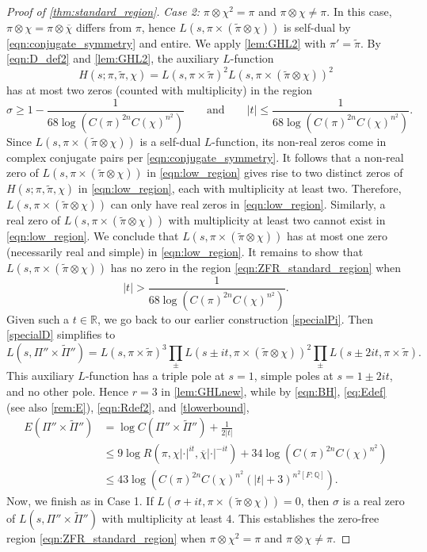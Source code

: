 \documentclass[12pt]{amsart}
\theoremstyle{definition}
\theoremstyle{remark}
\numberwithin{equation}{section}
\theoremstyle{plain}
\renewcommand{\tilde}{\widetilde}
\renewcommand{\bar}{\overline}
\newcommand{\Q}{\mathbb{Q}}
\newcommand{\R}{\mathbb{R}}
\begin{document}
\begin{proof}[Proof of \cref{thm:standard_region}]
\emph{Case 2:} $\pi\otimes\chi^2=\pi$ and $\pi\otimes\chi\neq\pi$. In this case, $\pi\otimes\chi=\pi\otimes\bar{\chi}$ differs from $\pi$, hence
$L(s,\pi\times(\tilde{\pi}\otimes\chi))$ is self-dual by \eqref{eqn:conjugate_symmetry} and entire.  We apply \cref{lem:GHL2} with $\pi'=\tilde\pi$. By \eqref{eqn:D_def2} and \cref{lem:GHL2}, the auxiliary $L$-function
\[H(s;\pi,\tilde\pi,\chi)=L(s,\pi\times\tilde\pi)^2L(s,\pi\times(\tilde{\pi}\otimes\chi))^2\]
has at most two zeros (counted with multiplicity) in the region
\begin{equation}
\label{eqn:low_region}
\sigma\geq 1-\frac{1}{68\log(C(\pi)^{2n}C(\chi)^{n^2})}
\qquad\text{and}\qquad
|t|\leq\frac{1}{68\log(C(\pi)^{2n}C(\chi)^{n^2})}.
\end{equation}
Since $L(s,\pi\times(\tilde{\pi}\otimes\chi))$ is a self-dual $L$-function, its non-real zeros come in complex conjugate pairs per \eqref{eqn:conjugate_symmetry}.  It follows that a non-real zero of $L(s,\pi\times(\tilde{\pi}\otimes\chi))$ in \eqref{eqn:low_region} gives rise to two distinct zeros of $H(s;\pi,\tilde\pi,\chi)$ in \eqref{eqn:low_region}, each with multiplicity at least two. Therefore, $L(s,\pi\times(\tilde{\pi}\otimes\chi))$ can only have real zeros in \eqref{eqn:low_region}. Similarly, a real zero of $L(s,\pi\times(\tilde{\pi}\otimes\chi))$ with multiplicity at least two cannot exist in \eqref{eqn:low_region}.  We conclude that $L(s,\pi\times(\tilde{\pi}\otimes\chi))$ 
has at most one zero (necessarily real and simple) in \eqref{eqn:low_region}. It remains to show that $L(s,\pi\times(\tilde{\pi}\otimes\chi))$ has no zero in the region \eqref{eqn:ZFR_standard_region} when
\begin{equation}
\label{tlowerbound}
|t|>\frac{1}{68\log(C(\pi)^{2n}C(\chi)^{n^2})}.
\end{equation}
Given such a $t\in\R$, we go back to our earlier construction \eqref{specialPi}. Then \eqref{specialD} simplifies to
\[
L(s,\Pi''\times\tilde{\Pi}'')=
L(s,\pi\times\tilde\pi)^3\prod_{\pm}L(s\pm it,\pi\times(\tilde\pi\otimes\chi))^2\prod_{\pm} L(s\pm 2it,\pi\times\tilde\pi).
\]
This auxiliary $L$-function has a triple pole at $s=1$, simple poles at $s=1\pm 2it$, and no other pole.  Hence $r=3$ in \cref{lem:GHLnew}, while by \eqref{eqn:BH}, \eqref{eq:Edef} (see also \cref{rem:E}), \eqref{eqn:Rdef2}, and \eqref{tlowerbound},
\begin{align*}
E(\Pi''\times\tilde{\Pi}'')
&=\log C(\Pi''\times\tilde{\Pi}'')+\frac{1}{2|t|}\\
&\leq 9\log R(\pi,\chi|\cdot|^{it},\bar{\chi}|\cdot|^{-it})+34\log(C(\pi)^{2n}C(\chi)^{n^2})\\
&\leq 43\log(C(\pi)^{2n}C(\chi)^{n^2}(|t|+3)^{n^2[F:\Q]}).
\end{align*}
Now, we finish as in Case 1. If $L(\sigma+it,\pi\times(\tilde{\pi}\otimes\chi))=0$, then $\sigma$ is a real zero of $L(s,\Pi''\times\tilde{\Pi}'')$ with multiplicity at least $4$.  This establishes the zero-free region \eqref{eqn:ZFR_standard_region} when $\pi\otimes\chi^2=\pi$ and $\pi\otimes\chi\neq\pi$.


\end{proof}
\end{document}
